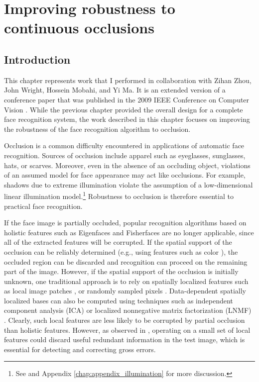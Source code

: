 \chapter{Improving robustness to continuous occlusions}
\label{chap:markov}

\section{Introduction} 


This chapter represents work that I performed in collaboration with Zihan Zhou,
John Wright, Hossein Mobahi, and Yi Ma.  It is an extended version of a
conference paper that was published in the 2009 IEEE Conference on Computer
Vision \cite{ZhouZ2009}.  While the previous chapter provided the overall
design for a complete face recognition system, the work described in this
chapter focuses on improving the robustness of the face recognition algorithm
to occlusion.

Occlusion is a common difficulty encountered in applications of automatic face
recognition. Sources of occlusion include apparel such as  eyeglasses,
sunglasses, hats, or scarves. 
Moreover, even in the absence of an occluding object,
violations of an assumed model for face appearance may act like occlusions. For example, shadows due to extreme illumination violate the assumption of a
low-dimensional linear illumination model.\footnote{See \cite{Basri2003-PAMI} and Appendix
\ref{chap:appendix_illumination} for more discussion.} Robustness to
occlusion is therefore essential to practical face recognition.

If the face image is partially occluded, popular recognition algorithms based
on holistic features such as Eigenfaces and Fisherfaces
\cite{Turk1991-CVPR,Belhumeur1997-PAMI} are no longer applicable, since all of
the extracted features will be corrupted. If the spatial support of the
occlusion can be reliably determined (e.g., using features such as color
\cite{Jia2008-FGR,Jia2009-CVPR}), the occluded region can be discarded and
recognition can proceed on the remaining part of the image. However, if the
spatial support of the occlusion is initially unknown, one traditional approach
is to rely on spatially localized features such as local image patches
\cite{Martinez-02,Pentland1994-CVPR,Ahonen2006-PAMI}, or randomly sampled
pixels \cite{Leonardis2000-CVIU,Fidler2006-PAMI}. Data-dependent spatially
localized bases can also be computed using techniques such as independent
component analysis (ICA) or localized nonnegative matrix factorization (LNMF)
\cite{KimJ2005-PAMI,LiS2001-CVPR}. Clearly, such local features are less likely
to be corrupted by partial occlusion than holistic features. However, as
observed in \cite{Wright2009-PAMI}, operating on a small set of local features
could discard useful redundant information in the test image, which is
essential for detecting and correcting gross errors.

